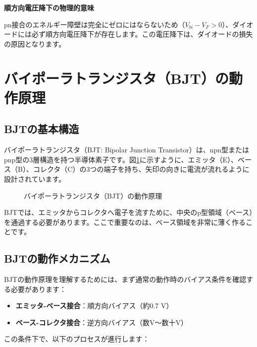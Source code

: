 \textbf{順方向電圧降下の物理的意味}

pn接合のエネルギー障壁は完全にゼロにはならないため（$V_{bi} - V_F > 0$）、ダイオードには必ず順方向電圧降下が存在します。この電圧降下は、ダイオードの損失の原因となります。

\section{バイポーラトランジスタ（BJT）の動作原理}

\subsection{BJTの基本構造}

バイポーラトランジスタ（BJT: Bipolar Junction Transistor）は、npn型またはpnp型の3層構造を持つ半導体素子です。図\ref{fig:bjt_structure}に示すように、エミッタ（E）、ベース（B）、コレクタ（C）の3つの端子を持ち、矢印の向きに電流が流れるように設計されています。

\begin{figure}[H]
\centering
{}
\caption{バイポーラトランジスタ（BJT）の動作原理}
\label{fig:bjt_structure}
\end{figure}

BJTでは、エミッタからコレクタへ電子を流すために、中央のp型領域（ベース）を通過する必要があります。ここで重要なのは、ベース領域を非常に薄く作ることです。

\subsection{BJTの動作メカニズム}

BJTの動作原理を理解するためには、まず通常の動作時のバイアス条件を確認する必要があります：

\begin{itemize}
\item \textbf{エミッタ-ベース接合}：順方向バイアス（約0.7 V）
\item \textbf{ベース-コレクタ接合}：逆方向バイアス（数V〜数十V）
\end{itemize}

この条件下で、以下のプロセスが進行します：

